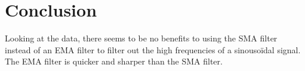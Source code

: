 \chapter{Conclusion}

Looking at the data, there seems to be no benefits to using the SMA filter instead of an EMA filter to filter out the high frequencies of a sinousoïdal signal. The EMA filter is quicker and sharper than the SMA filter.